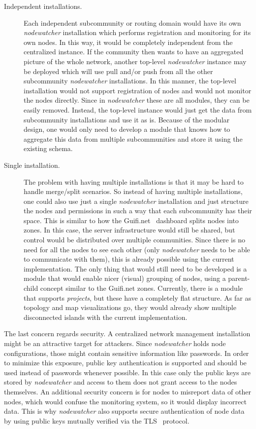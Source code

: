 \documentclass[5p,sort&compress]{elsarticle}
\newcommand{\nodewatcher}{\textit{nodewatcher}}
\begin{document}
\begin{description}
    \item[Independent installations.] Each independent subcommunity or routing domain would have its own \nodewatcher{} installation which performs registration and monitoring for its own nodes.
    In this way, it would be completely independent from the centralized instance.
    If the community then wants to have an aggregated picture of the whole network, another top-level \nodewatcher{} instance may be deployed which will use pull and/or push from all the other subcommunity \nodewatcher{} installations.
    In this manner, the top-level installation would not support registration of nodes and would not monitor the nodes directly.
    Since in \nodewatcher{} these are all modules, they can be easily removed.
    Instead, the top-level instance would just get the data from subcommunity installations and use it as is.
    Because of the modular design, one would only need to develop a module that knows how to aggregate this data from multiple subcommunities and store it using the existing schema.

    \item[Single installation.] The problem with having multiple installations is that it may be hard to handle merge/split scenarios.
    So instead of having multiple installations, one could also use just a single \nodewatcher{} installation and just structure the nodes and permissions in such a way that each subcommunity has their space.
    This is similar to how the Guifi.net~\cite{Guifinode_2003,Vega_2012} dashboard splits nodes into zones.
    In this case, the server infrastructure would still be shared, but control would be distributed over multiple communities.
    Since there is no need for all the nodes to see each other (only \nodewatcher{} needs to be able to communicate with them), this is already possible using the current implementation.
    The only thing that would still need to be developed is a module that would enable nicer (visual) grouping of nodes, using a parent-child concept similar to the Guifi.net zones.
    Currently, there is a module that supports \textit{projects}, but these have a completely flat structure.
    As far as topology and map visualizations go, they would already show multiple disconnected islands with the current implementation.
\end{description}

The last concern regards security.
A centralized network management installation might be an attractive target for attackers.
Since \nodewatcher{} holds node configurations, those might contain sensitive information like passwords.
In order to minimize this exposure, public key authentication is supported and should be used instead of passwords whenever possible.
In this case only the public keys are stored by \nodewatcher{} and access to them does not grant access to the nodes themselves.
An additional security concern is for nodes to misreport data of other nodes, which would confuse the monitoring system, so it would display incorrect data.
This is why \nodewatcher{} also supports secure authentication of node data by using public keys mutually verified via the TLS~\cite{RFC_5246} protocol.
\end{document}
